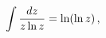 \[\int\frac{dz}{z\mathop{\ln\/}\nolimits z}=\mathop{\ln\/}\nolimits\!\left(%
\mathop{\ln\/}\nolimits z\right),\]